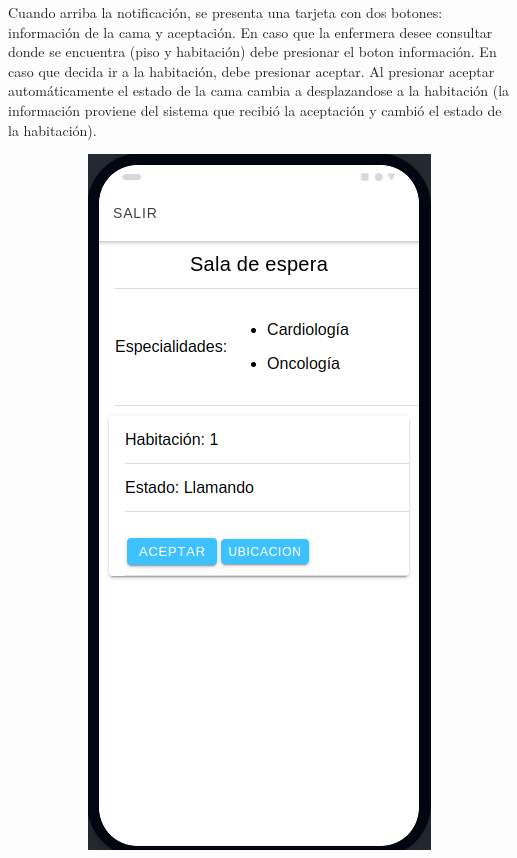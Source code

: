 Cuando arriba la notificación, se presenta una tarjeta con dos botones: información de la cama y aceptación. En caso que la enfermera desee consultar donde se encuentra (piso y habitación) debe presionar el boton información. En caso que decida ir a la habitación, debe presionar aceptar.
Al presionar aceptar automáticamente el estado de la cama cambia a desplazandose a la habitación (la información proviene del sistema que recibió la aceptación y cambió el estado de la habitación).


\begin{figure}[!htpb]
     \centering
     \begin{subfigure}[b]{0.3\textwidth}
         \centering
         \includegraphics[width=.95\textwidth]{./Figures/app/enfermera-peticion.png}

\end{subfigure}
\end{figure}
